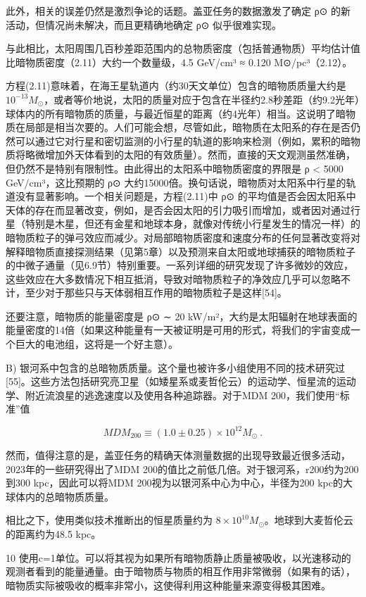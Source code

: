 此外，相关的误差仍然是激烈争论的话题。盖亚任务的数据激发了确定 ρ⊙ 的新活动，但情况尚未解决，而且更精确地确定 ρ⊙ 似乎很难实现。

与此相比，太阳周围几百秒差距范围内的总物质密度（包括普通物质）平均估计值比暗物质密度（2.11）大约一个数量级，4.5 GeV/cm³ ≈ 0.120 M⊙/pc³（2.12）。

方程(2.11)意味着，在海王星轨道内（约30天文单位）包含的暗物质质量大约是 \(10^{-13} M_\odot\)，或者等价地说，太阳的质量对应于包含在半径约2.8秒差距（约9.2光年）球体内的所有暗物质的质量，与最近恒星的距离（约4光年）相当。这说明了暗物质在局部是相当次要的。人们可能会想，尽管如此，暗物质在太阳系的存在是否仍然可以通过它对行星和密切监测的小行星的轨道的影响来检测（例如，累积的暗物质将略微增加外天体看到的太阳的有效质量）。然而，直接的天文观测虽然准确，但仍然不是特别有限制性。由此得出的太阳系中暗物质密度的界限是 ρ < 5000 GeV/cm³，这比预期的 ρ⊙ 大约15000倍。换句话说，暗物质对太阳系中行星的轨道没有显著影响。一个相关问题是，方程(2.11)中 ρ⊙ 的平均值是否会因太阳系中天体的存在而显著改变，例如，是否会因太阳的引力吸引而增加，或者因对通过行星（特别是木星，但还有金星和地球本身，就像对传统小行星发生的情况一样）的暗物质粒子的弹弓效应而减少。对局部暗物质密度和速度分布的任何显著改变将对解释暗物质直接探测结果（见第5章）以及预测来自太阳或地球捕获的暗物质粒子的中微子通量（见6.9节）特别重要。一系列详细的研究发现了许多微妙的效应，这些效应在大多数情况下相互抵消，导致对暗物质粒子的净效应几乎可以忽略不计，至少对于那些只与天体弱相互作用的暗物质粒子是这样[54]。

还要注意，暗物质的能量密度是 ρ⊙ ∼ 20 kW/m²，大约是太阳辐射在地球表面的能量密度的14倍（如果这种能量有一天被证明是可用的形式，将我们的宇宙变成一个巨大的电池组，这将是一个好主意）。

B) 银河系中包含的总暗物质质量。这个量也被许多小组使用不同的技术研究过[55]。这些方法包括研究亮卫星（如矮星系或麦哲伦云）的运动学、恒星流的运动学、附近流浪星的逃逸速度以及使用各种追踪器。对于MDM 200，我们使用“标准”值

\[ MDM_{200} \equiv (1.0 \pm 0.25) \times 10^{12} M_\odot ~. \]

然而，值得注意的是，盖亚任务的精确天体测量数据的出现导致最近很多活动，2023年的一些研究得出了MDM 200的值比之前低几倍。对于银河系，r200约为200到300 kpc，因此可以将MDM 200视为以银河系中心为中心，半径为200 kpc的大球体内的总暗物质质量。

相比之下，使用类似技术推断出的恒星质量约为 \(8 \times 10^{10} M_\odot\)。地球到大麦哲伦云的距离约为48.5 kpc。

10 使用c=1单位。可以将其视为如果所有暗物质静止质量被吸收，以光速移动的观测者看到的能量通量。由于暗物质与物质的相互作用非常微弱（如果有的话），暗物质实际被吸收的概率非常小，这使得利用这种能量来源变得极其困难。

